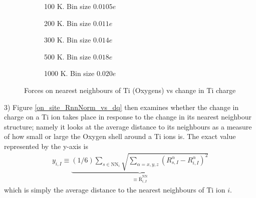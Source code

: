 \documentclass[11pt, a4paper]{report}
\begin{document}
\begin{figure}[h!]
\centering
	\begin{subfigure}[b]{0.45\textwidth}
	\hspace*{-0.4cm}
	
	\vspace*{-0.4cm}
	\caption{100 K. Bin size $0.0105e$}
	\end{subfigure}
	\hspace{0.6cm}
	\begin{subfigure}[b]{0.45\textwidth}
	\hspace*{-0.4cm}
	
	\vspace*{-0.4cm}
	\caption{200 K. Bin size $0.011e$}
	\end{subfigure}
	\quad
	\begin{subfigure}[b]{0.45\textwidth}
	\hspace*{-0.4cm}
	
    \vspace*{-0.4cm}
	\caption{300 K. Bin size $0.014e$}
	\end{subfigure}
	\hspace{0.6cm}
	\begin{subfigure}[b]{0.45\textwidth}
	\hspace*{-0.4cm}
	
    \vspace*{-0.4cm}
	\caption{500 K. Bin size $0.018e$}
	\end{subfigure}
	\quad
	\begin{subfigure}[b]{0.45\textwidth}
	\hspace*{-0.4cm}
	
    \vspace*{-0.4cm}
	\caption{1000 K. Bin size $0.020e$}
	\end{subfigure}
\caption{Forces on nearest neighbours of Ti (Oxygens) vs change in Ti charge}
\label{on_site_FerrNN_vs_dq}
\end{figure}

3) Figure \ref{on_site_RnnNorm_vs_dq} then examines whether the change in charge on a Ti ion takes place in response to the change in its nearest neighbour structure; namely it looks at the average distance to its neighbours as a measure of how small or large the Oxygen shell around a Ti ions is. The exact value represented by the y-axis is
\begin{align}
y_{i,I} \equiv\underbrace{ (1/6)\sum_{s\in \text{NN}_i}\sqrt{\sum_{\alpha = x,y,z}\left(R_{s,I}^{\alpha}-R_{i,I}^{\alpha}\right)^2}}_{\equiv\bar{\text{R}}_{i,I}^{\text{NN}}}
\end{align}\label{RnnAve}
which is simply the average distance to the nearest neighbours of Ti ion $i$. 
\end{document}
